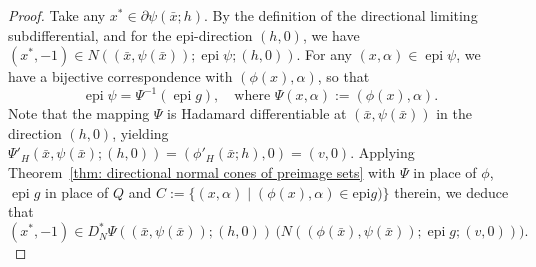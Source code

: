 \documentclass[12pt,twoside,reqno]{amsart}
\theoremstyle{definition}
\numberwithin{equation}{section}
\begin{document}
\begin{proof}
Take any $x^*\in \partial \psi(\bar x; h)$. By the definition of the directional limiting subdifferential, and for the epi-direction $(h, 0)$, we have  
\( (x^*, -1) \in N((\bar{x}, \psi(\bar{x})); \operatorname{epi} \psi; (h, 0)) \).  
For any \( (x, \alpha) \in \operatorname{epi} \psi \), we have a bijective correspondence with \( (\phi(x), \alpha) \), so that
\[
    \operatorname{epi} \psi = \Psi^{-1}(\operatorname{epi} g),
    \quad \text{where } \Psi(x, \alpha) := (\phi(x), \alpha).
\]
Note that the mapping $\Psi$ is Hadamard differentiable at $(\bar{x}, \psi(\bar{x}))$ in the direction $(h, 0)$, yielding $\Psi'_H(\bar{x}, \psi(\bar{x}); (h, 0)) = (\phi'_H(\bar{x}; h), 0) = (v, 0)$.
Applying Theorem~\ref{thm: directional normal cones of preimage sets} with \( \Psi \) in place of \( \phi \), \( \operatorname{epi} g \) in place of \( Q \) and $C:=\{(x,\alpha) \mid (\phi(x),\alpha)\in \text{epi}g)\}$ therein,   
we deduce that
\begin{equation}\label{eq:preimage_chain}
    (x^*, -1) 
    \in D^*_N \Psi((\bar{x},\psi(\bar x)); (h, 0)) \,
    \big( N((\phi(\bar{x}), \psi(\bar{x})); \operatorname{epi} g; (v, 0)) \big).
\end{equation}


\end{proof}
\end{document}
